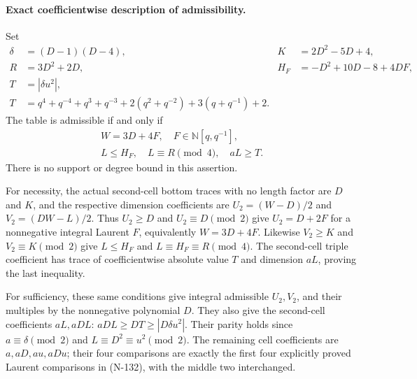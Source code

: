 \paragraph{Exact coefficientwise description of admissibility.}
Set
\[
\begin{aligned}
 \delta&=(D-1)(D-4),&
 K&=2D^2-5D+4,\\
 R&=3D^2+2D,&
 H_F&=-D^2+10D-8+4DF,\\
 T&=|\delta u^2|,\\
 T&=q^4+q^{-4}+q^3+q^{-3}
       +2(q^2+q^{-2})+3(q+q^{-1})+2.
\end{aligned}\tag{N-156}
\]
The table is admissible if and only if
\[
 \boxed{\begin{gathered}
 W=3D+4F,\quad F\in\mathbb N[q,q^{-1}],\\
 L\le H_F,\quad L\equiv R\pmod4,\quad aL\ge T.
 \end{gathered}}
 \tag{N-157}
\]
There is no support or degree bound in this assertion.

For necessity, the actual second-cell bottom traces with no length
factor are $D$ and $K$, and the respective dimension coefficients
are $U_2=(W-D)/2$ and $V_2=(DW-L)/2$.
Thus $U_2\ge D$ and $U_2\equiv D\pmod2$ give
$U_2=D+2F$ for a nonnegative integral Laurent $F$, equivalently
$W=3D+4F$.  Likewise $V_2\ge K$ and $V_2\equiv K\pmod2$
give $L\le H_F$ and $L\equiv H_F\equiv R\pmod4$.
The second-cell triple coefficient has trace of coefficientwise
absolute value $T$ and dimension $aL$, proving the last inequality.

For sufficiency, these same conditions give integral admissible
$U_2,V_2$, and their multiples by the nonnegative polynomial $D$.
They also give the second-cell coefficients $aL,aDL$:
$aDL\ge DT\ge|D\delta u^2|$.
Their parity holds since $a\equiv\delta\pmod2$ and
$L\equiv D^2\equiv u^2\pmod2$.
The remaining cell coefficients are $a,aD,au,aDu$;
their four comparisons are exactly the first four explicitly proved
Laurent comparisons in (N-132), with the middle two interchanged.

